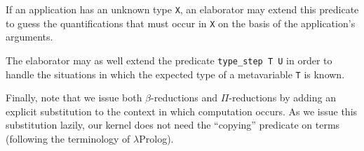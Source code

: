 If an application has an unknown type \verb+X+,
an elaborator may extend this predicate to guess the quantifications
that must occur in \verb+X+ on the basis of the application's arguments.

The elaborator may as well extend the predicate \verb+type_step T U+
in order to handle the situations in which
the expected type of a metavariable \verb+T+ is known.

Finally, note that we issue both $\beta$-reductions and $\Pi$-reductions
by adding an explicit substitution to the context in which computation occurs.
As we issue this substitution lazily,
our kernel does not need the ``copying'' predicate on terms
(following the terminology of $\lambda$Prolog).

